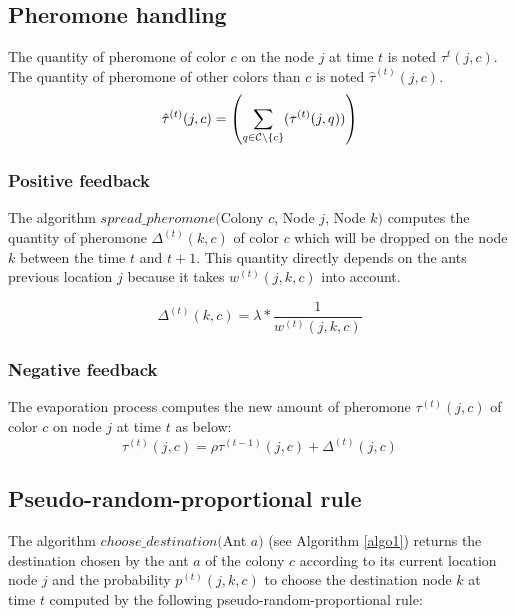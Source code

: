 \documentclass[a4paper,10pt]{article}
\begin{document}
\subsection{Pheromone handling}

The quantity of pheromone of color $c$ on the node $j$ at time $t$ is noted $\tau^{t}(j,c)$. The quantity of pheromone of other colors than $c$ is noted $\hat \tau^{(t)}(j,c)$.
\begin{equation*}
    \hat \tau^{(t)}(j,c) = \left( \sum_{q \in {\cal{C}} \backslash \{c\}}(\tau^{(t)} (j,q)) \right)
\end{equation*}



\subsubsection{Positive feedback}
The algorithm $spread\_pheromone($Colony $c$, Node $j$, Node $k)$ computes the quantity of pheromone $\Delta^{(t)}(k,c)$ of color $c$  which will be dropped on the node $k$ between the time $t$ and $t+1$. This quantity directly depends on the ants previous location $j$ because it takes $w^{(t)}(j,k,c)$ into account.

\begin{equation*}
 \Delta^{(t)}(k,c) = \lambda * \frac{1}{w^{(t)}(j,k,c)}
\end{equation*}

\subsubsection{Negative feedback}
The evaporation process computes the new amount of pheromone $\tau^{(t)}(j,c)$ of color $c$ on node $j$ at time $t$ as below:
\begin{equation*}
 \tau^{(t)}(j,c) = \rho \tau^{(t-1)}(j,c) + \Delta^{(t)}(j,c)
\end{equation*}

\subsection{Pseudo-random-proportional rule}
The algorithm $choose\_destination($Ant $a)$ (see Algorithm \ref{algo1}) returns the destination chosen by the ant $a$ of the colony $c$ according to its current location node $j$ and the probability $p^{(t)}(j,k,c)$ to choose the destination node $k$ at time $t$ computed by the following pseudo-random-proportional rule:
\end{document}
